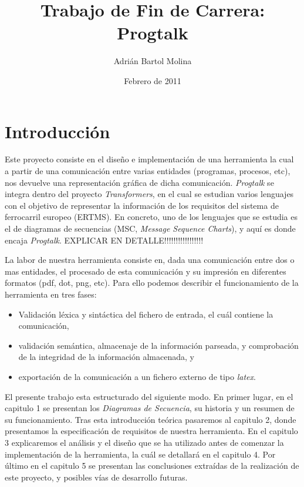 \documentclass[12pt,a4paper]{report}
\title{Trabajo de Fin de Carrera: Progtalk}
\author{Adrián Bartol Molina}
\date{Febrero de 2011}
\begin{document}
\maketitle

\chapter{Introducción}

Este proyecto consiste en el diseño e implementación de una herramienta la cual a partir de una comunicación entre varias entidades (programas, procesos, etc), nos devuelve una representación gráfica de dicha comunicación. \textit{Progtalk} se integra dentro del proyecto \textit{Transformers}, en el cual se estudian varios lenguajes con el objetivo de representar la información de los requisitos del sistema de ferrocarril europeo (ERTMS). En concreto, uno de los lenguajes que se estudia es el de diagramas de secuencias (MSC, \emph{Message Sequence Charts}), y aquí es donde encaja \textit{Progtalk}. EXPLICAR EN DETALLE!!!!!!!!!!!!!!!!!

La labor de nuestra herramienta consiste en, dada una comunicación entre dos o mas entidades, el procesado de esta comunicación y su impresión en diferentes formatos (pdf, dot, png, etc). Para ello podemos describir el funcionamiento de la herramienta en tres fases:

\begin{itemize}
\item Validación léxica y sintáctica del fichero de entrada, el cuál contiene la comunicación,
\item validación semántica, almacenaje de la información parseada, y comprobación de la integridad de la información almacenada, y
\item exportación de la comunicación a un fichero externo de tipo \textit{latex}.
\end{itemize}

El presente trabajo esta estructurado del siguiente modo. En primer lugar, en el capitulo 1 se presentan los \textit{Diagramas de Secuencia}, su historia y un resumen de su funcionamiento. Tras esta introducción teórica pasaremos al capitulo 2, donde presentamos la especificación de requisitos de nuestra herramienta. En el capitulo 3 explicaremos el análisis y el diseño que se ha utilizado antes de comenzar la implementación de la herramienta, la cuál se detallará en el capitulo 4. Por último en el capitulo 5 se presentan las conclusiones extraídas de la realización de este proyecto, y posibles vías de desarrollo futuras.
\end{document}
